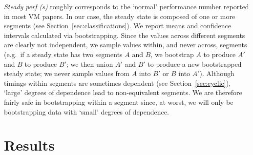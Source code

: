 \documentclass[acmlarge]{acmart}\settopmatter{printfolios=true}
\begin{document}
\emph{Steady perf (s)} roughly corresponds to the `normal' performance number reported
in most VM papers. In our case, the steady state is composed of one or more
segments (see Section~\ref{sec:classifications}). We report means and
 confidence intervals
calculated via  bootstrapping. Since the values across different segments are clearly not
independent, we sample values within, and never across, segments (e.g.~if a
steady state has two segments $A$ and $B$, we bootstrap $A$ to produce $A'$ and
$B$ to produce $B'$; we then union $A'$ and $B'$ to produce a new bootstrapped
steady state; we never sample values from $A$ into $B'$ or $B$ into $A'$).
Although timings within segments are sometimes dependent (see
Section~\ref{sec:cyclic}), `large' degrees of dependence lead to
non-equivalent segments. We are therefore fairly safe in bootstrapping
within a segment since, at worst, we will only be bootstrapping data with
`small' degrees of dependence.


\section{Results}
\label{sec:results}
\end{document}
